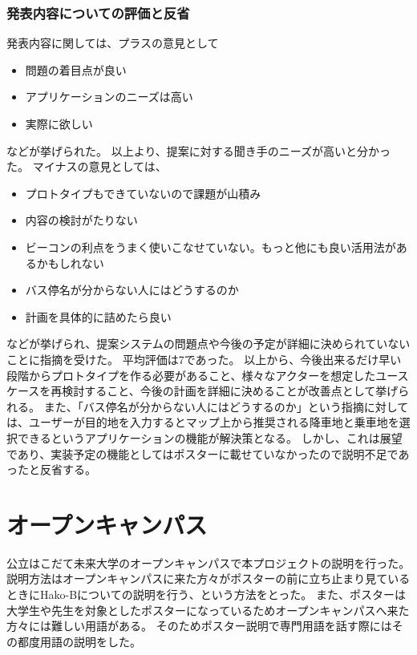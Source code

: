 \documentclass[openany,11pt,papersize]{jsbook}
\begin{document}
\subsubsection{発表内容についての評価と反省}
発表内容に関しては、プラスの意見として
\begin{itemize}

\item 問題の着目点が良い
\item アプリケーションのニーズは高い
\item 実際に欲しい

\end{itemize}
などが挙げられた。
以上より、提案に対する聞き手のニーズが高いと分かった。
マイナスの意見としては、
\begin{itemize}

\item プロトタイプもできていないので課題が山積み
\item 内容の検討がたりない
\item ビーコンの利点をうまく使いこなせていない。もっと他にも良い活用法があるかもしれない
\item バス停名が分からない人にはどうするのか
\item 計画を具体的に詰めたら良い

\end{itemize}
などが挙げられ、提案システムの問題点や今後の予定が詳細に決められていないことに指摘を受けた。
平均評価は7であった。
以上から、今後出来るだけ早い段階からプロトタイプを作る必要があること、様々なアクターを想定したユースケースを再検討すること、今後の計画を詳細に決めることが改善点として挙げられる。
また、「バス停名が分からない人にはどうするのか」という指摘に対しては、ユーザーが目的地を入力するとマップ上から推奨される降車地と乗車地を選択できるというアプリケーションの機能が解決策となる。
しかし、これは展望であり、実装予定の機能としてはポスターに載せていなかったので説明不足であったと反省する。


\section{オープンキャンパス}
公立はこだて未来大学のオープンキャンパスで本プロジェクトの説明を行った。
説明方法はオープンキャンパスに来た方々がポスターの前に立ち止まり見ているときにHako-Bについての説明を行う、という方法をとった。
また、ポスターは大学生や先生を対象としたポスターになっているためオープンキャンパスへ来た方々には難しい用語がある。
そのためポスター説明で専門用語を話す際にはその都度用語の説明をした。
\end{document}
